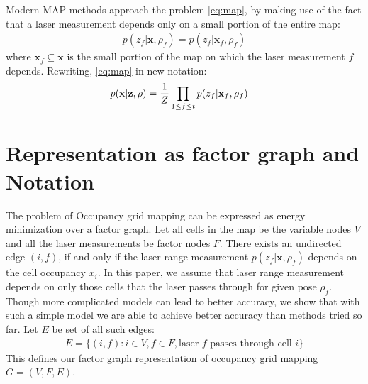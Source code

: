 \documentclass[letterpaper, 10 pt, conference]{ieeeconf} %
\newcommand{\vect}[1]{\mathbf{#1}}
\begin{document}
   Modern MAP methods approach the problem \eqref{eq:map}, by making use of the fact that a laser measurement depends only on a small portion of the entire map:
   \begin{align}
     p(z_f |\vect{x}, \rho_f) = p(z_f|\vect{x}_f, \rho_f)
   \end{align}
   where $\vect{x}_f \subseteq \vect{x}$ is the small portion of the map on which the laser measurement $f$ depends. Rewriting, \eqref{eq:map} in new notation:
   \begin{align}
     p(\map | \measurements, \rho) &= \frac{1}{Z} \prod_{1 \le f \le t} p(z_f|\map_f, \rho_f)
     \label{eq:modernmap}
   \end{align}


\section{Representation as factor graph and Notation}
\label{sec:notation}
The problem of Occupancy grid mapping can be expressed as energy minimization
over a factor graph. Let all cells in the map be the variable nodes $V$ and all
the laser measurements be factor nodes $F$. 
There exists an undirected edge $(i, f)$, if and only if the laser
range measurement $p(z_f|\vect{x}, \rho_f)$ depends on the cell occupancy 
$x_i$. In this paper, we assume that laser range measurement depends on only
those cells that the laser passes through for given pose $\rho_f$. Though more
complicated models can lead to better accuracy, we show that with such a simple
model we are able to achieve better accuracy than methods tried so far.
Let $E$ be set of all such edges:
\begin{align}
  E = \{(i, f) : i \in V, f \in F, \text{laser $f$ passes through cell $i$}\}
\end{align}
This defines our factor graph representation of occupancy grid mapping $G = (V, F, E)$.

%
%
\end{document}
